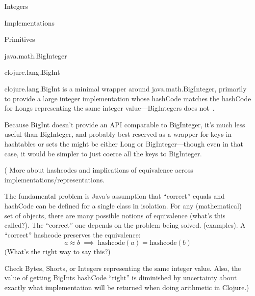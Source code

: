 \documentclass[12pt]{PalisadesLakesBook}
\begin{document}
\begin{plSection}{Integers}
\begin{plSection}{Implementations}
\begin{plSection}{Primitives}

\end{plSection}%
\begin{plSection}{\texorpdfstring{{\javaFont java.math.BigInteger}}{java.math.BigInteger}}

\end{plSection}%
\begin{plSection}{\texorpdfstring{{\javaFont clojure.lang.BigInt}}{clojure.lang.BigInt}}

{\javaFont clojure.lang.BigInt} is a minimal wrapper around
{\javaFont java.math.BigInteger}, primarily to provide
a large integer implementation whose {\javaFont hashCode}
matches the {\javaFont hashCode} for {\javaFont Long}s
representing the same integer value---{\javaFont BigInteger}s
does not~\cite[page 438]{EmerickCarperGrand:2012:ClojureProgramming}.

Because {\javaFont BigInt} doesn't provide an API comparable to
{\javaFont BigInteger}, it's much less useful than
{\javaFont BigInteger}, and probably best reserved as a wrapper
for keys in hashtables or sets the might be either
{\javaFont Long} or {\javaFont BigInteger}---though even in that
case, it would be simpler to just coerce all the keys to
{\javaFont BigInteger}.

(\TODO 
More about hashcodes and implications of equivalence across 
implementations/representations.

The fundamental problem is Java's assumption
that ``correct'' {\javaFont equals}
and {\javaFont hashCode} can be defined for a single class
in isolation.
For any (mathematical) set of objects, there are many possible
notions of equivalence (\TODO what's this called?).
The ``correct'' one depends on the problem being solved.
(\TODO examples).
A ``correct'' hashcode preserves the equivalence:
\begin{equation}
a \approx b \; \implies \; \text{hashcode}(a) = \text{hashcode}(b)
\end{equation}
(What's the right way to say this?)

Check {\javaFont Byte}s, {\javaFont Short}s, or
{\javaFont Integer}s representing the same integer value.
Also, the value of getting {\javaFont BigInt}s
{\javaFont hashCode} ``right'' is diminished by uncertainty
about exactly what implementation will be returned when
doing arithmetic in Clojure.) 


\end{plSection}
\end{plSection}
\end{plSection}
\end{document}
